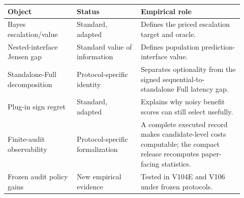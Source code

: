 \begin{tabular}{p{0.27\linewidth}p{0.25\linewidth}p{0.40\linewidth}}
\toprule
Object & Status & Empirical role \\
\midrule
Bayes escalation/value & Standard, adapted & Defines the priced escalation target and oracle. \\
Nested-interface Jensen gap & Standard value of information & Defines population prediction-interface value. \\
Standalone-Full decomposition & Protocol-specific identity & Separates optionality from the signed sequential-to-standalone Full latency gap. \\
Plug-in sign regret & Standard, adapted & Explains why noisy benefit scores can still select usefully. \\
Finite-audit observability & Protocol-specific formalization & A complete executed record makes candidate-level costs computable; the compact release recomputes paper-facing statistics. \\
Frozen audit policy gains & New empirical evidence & Tested in V104E and V106 under frozen protocols. \\
\bottomrule
\end{tabular}
